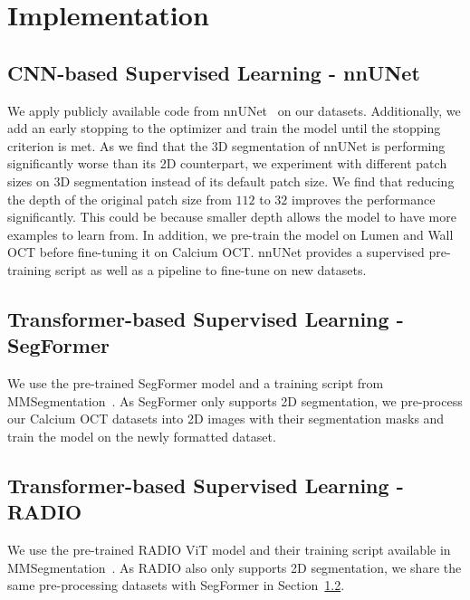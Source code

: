 \documentclass[a4paper,11pt,oneside]{report}
\begin{document}
\chapter{Implementation}


\section{CNN-based Supervised Learning - nnUNet}
We apply publicly available code from nnUNet~\cite{Isensee2020} on our datasets. Additionally, we add an early stopping to the optimizer and train the model until the stopping criterion is met. As we find that the 3D segmentation of nnUNet is performing significantly worse than its 2D counterpart, we experiment with different patch sizes on 3D segmentation instead of its default patch size. We find that reducing the depth of the original patch size from $112$ to $32$ improves the performance significantly. This could be because smaller depth allows the model to have more examples to learn from. In addition, we pre-train the model on Lumen and Wall OCT before fine-tuning it on Calcium OCT. nnUNet provides a supervised pre-training script as well as a pipeline to fine-tune on new datasets.

\section{Transformer-based Supervised Learning - SegFormer}\label{sec:implementation:segformer}
We use the pre-trained SegFormer model and a training script from MMSegmentation~\cite{mmseg2020}. As SegFormer only supports 2D segmentation, we pre-process our Calcium OCT datasets into 2D images with their segmentation masks and train the model on the newly formatted dataset.

\section{Transformer-based Supervised Learning - RADIO}
We use the pre-trained RADIO ViT model and their training script available in MMSegmentation~\cite{mmseg2020}. As RADIO also only supports 2D segmentation, we share the same pre-processing datasets with SegFormer in Section~\ref{sec:implementation:segformer}.
\end{document}

